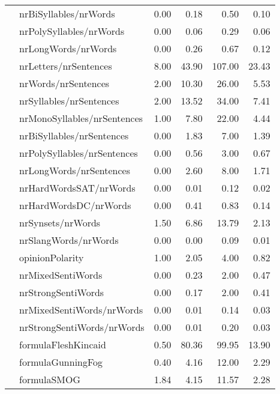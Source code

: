 \begin{tabular}{|l|l|r|r|r|r|}
 & nrBiSyllables/nrWords & 0.00 & 0.18 & 0.50 & 0.10 \\ \cline{2-6}
 & nrPolySyllables/nrWords & 0.00 & 0.06 & 0.29 & 0.06 \\ \cline{2-6}
 & nrLongWords/nrWords & 0.00 & 0.26 & 0.67 & 0.12 \\ \hline
\parbox[t]{2mm}{} & nrLetters/nrSentences & 8.00 & 43.90 & 107.00 & 23.43 \\ 
 & nrWords/nrSentences & 2.00 & 10.30 & 26.00 & 5.53 \\ 
 & nrSyllables/nrSentences & 2.00 & 13.52 & 34.00 & 7.41 \\ 
 & nrMonoSyllables/nrSentences & 1.00 & 7.80 & 22.00 & 4.44 \\ 
 & nrBiSyllables/nrSentences & 0.00 & 1.83 & 7.00 & 1.39 \\ 
 & nrPolySyllables/nrSentences & 0.00 & 0.56 & 3.00 & 0.67 \\ 
 & nrLongWords/nrSentences & 0.00 & 2.60 & 8.00 & 1.71 \\ \hline
\parbox[t]{2mm}{} & nrHardWordsSAT/nrWords & 0.00 & 0.01 & 0.12 & 0.02 \\ 
 & nrHardWordsDC/nrWords & 0.00 & 0.41 & 0.83 & 0.14 \\ 
 & nrSynsets/nrWords & 1.50 & 6.86 & 13.79 & 2.13 \\ 
 & nrSlangWords/nrWords & 0.00 & 0.00 & 0.09 & 0.01 \\ \hline
\parbox[t]{2mm}{} & opinionPolarity & 1.00 & 2.05 & 4.00 & 0.82 \\ 
 & nrMixedSentiWords & 0.00 & 0.23 & 2.00 & 0.47 \\ 
 & nrStrongSentiWords & 0.00 & 0.17 & 2.00 & 0.41 \\ 
 & nrMixedSentiWords/nrWords & 0.00 & 0.01 & 0.14 & 0.03 \\ 
 & nrStrongSentiWords/nrWords & 0.00 & 0.01 & 0.20 & 0.03 \\ \hline
\parbox[t]{2mm}{} & formulaFleshKincaid & 0.50 & 80.36 & 99.95 & 13.90 \\ 
 & formulaGunningFog & 0.40 & 4.16 & 12.00 & 2.29 \\ 
 & formulaSMOG & 1.84 & 4.15 & 11.57 & 2.28 \\ 

\end{tabular}

